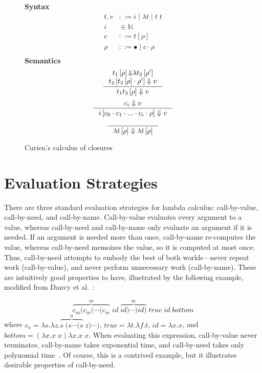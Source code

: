 \begin{figure}
\textbf{Syntax}
\begin{align*}
\tag{Term} t,v &::= i \; | \; \lambda t \; | \; t \; t  \\
\tag{Variable} i &\in \mathbb{N}  \\
\tag{Closure} c &::= t \left[\rho\right] \\
\tag{Environment} \rho &::= \bullet \; | \; c \cdot \rho \\
\end{align*}
\textbf{Semantics}
\begin{align*}
\inference
{t_1\left[\rho\right] {\Downarrow} \lambda t_2\left[\rho'\right] \\ 
 t_2\left[t_3\left[\rho\right] \cdot \rho'\right] \Downarrow v}
{t_1 t_3\left[\rho\right] \Downarrow v } 
\end{align*}
\begin{align*}
\inference
{c_i \Downarrow v}
{i \left[c_0 \cdot c_1 \cdot ... \cdot c_i \cdot \rho\right] \Downarrow v}
\end{align*}
\begin{align*}
\inference{}{\lambda t\left[\rho\right] \Downarrow \lambda t\left[\rho\right]}
\end{align*}
\caption{Curien's calculus of closures}
\label{fig:curien}
\end{figure}

\section{Evaluation Strategies} \label{sec:eval_strat}

There are three standard evaluation strategies for lambda calculus:
call-by-value, call-by-need, and call-by-name.  Call-by-value evaluates every argument
to a value, whereas call-by-need and call-by-name only evaluate an argument if
it is needed.  If an argument is needed more than once, call-by-name re-computes
the value, whereas call-by-need memoizes the value, so it is computed at most once.
Thus, call-by-need attempts to embody the best of both worlds---never repeat
work (call-by-value), and never perform unnecessary work (call-by-name). These
are intuitively good properties to have, illustrated by the following example,
modified from Danvy et al.~\cite{danvy2013synthetic}:

$$ \overbrace{c_m (c_m (\cdots(c_m}^{m} \; \mathit{id} \;
\overbrace{\mathit{id})\cdots) \mathit{id})}^{m} \; \mathit{true} \;
\mathit{id} \; \mathit{bottom} $$ where $c_n = \lambda s.\lambda z.\overbrace{s
\; (s \cdots (s}^{n} \; z) \cdots) $, $\mathit{true} = \lambda t.\lambda f.t$,
$\mathit{id}=\lambda x.x$, and \\ $\mathit{bottom} = (\lambda x.x \; x) \lambda x.x \; x$.
When evaluating this expression, call-by-value never terminates, call-by-name
takes exponential time, and call-by-need takes only polynomial time~\cite{danvy2013synthetic}. Of course, this is a contrived example, but it
illustrates desirable properties of call-by-need.

